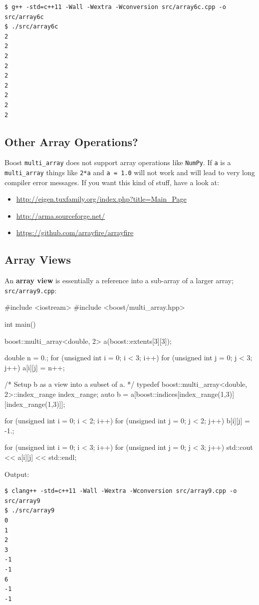 \documentclass[12pt,letterpaper,twoside]{article}
\begin{document}
\begin{verbatim}
$ g++ -std=c++11 -Wall -Wextra -Wconversion src/array6c.cpp -o src/array6c
$ ./src/array6c
2
2
2
2
2
2
2
2
2
\end{verbatim}

\subsection{Other Array Operations?}
Boost \texttt{multi\_array} does not support array operations like
\texttt{NumPy}.
If \texttt{a} is a \texttt{multi\_array} things like \texttt{2*a} and
\texttt{a\ =\ 1.0} will not work and will lead to very long compiler
error messages.
If you want this kind of stuff, have a look at:

\begin{itemize}
\item
  \url{http://eigen.tuxfamily.org/index.php?title=Main\_Page}
\item
  \url{http://arma.sourceforge.net/}
\item
  \url{https://github.com/arrayfire/arrayfire}
\end{itemize}

\subsection{Array Views}
An \textbf{array view} is essentially a reference into a sub-array of a
larger array;
\texttt{src/array9.cpp}:

\begin{cpp}
#include <iostream>
#include <boost/multi_array.hpp>

int main() {
  boost::multi_array<double, 2> a(boost::extents[3][3]);

  double n = 0.;
  for (unsigned int i = 0; i < 3; i++)
    for (unsigned int j = 0; j < 3; j++)
      a[i][j] = n++;

  /* Setup b as a view into a subset of a. */
  typedef boost::multi_array<double, 2>::index_range index_range;
  auto b = a[boost::indices[index_range(1,3)][index_range(1,3)]];

  for (unsigned int i = 0; i < 2; i++)
    for (unsigned int j = 0; j < 2; j++)
      b[i][j] = -1.;

  for (unsigned int i = 0; i < 3; i++)
    for (unsigned int j = 0; j < 3; j++)
      std::cout << a[i][j] << std::endl;
}
\end{cpp}

Output:

\begin{verbatim}
$ clang++ -std=c++11 -Wall -Wextra -Wconversion src/array9.cpp -o src/array9
$ ./src/array9
0
1
2
3
-1
-1
6
-1
-1
\end{verbatim}
\end{document}
